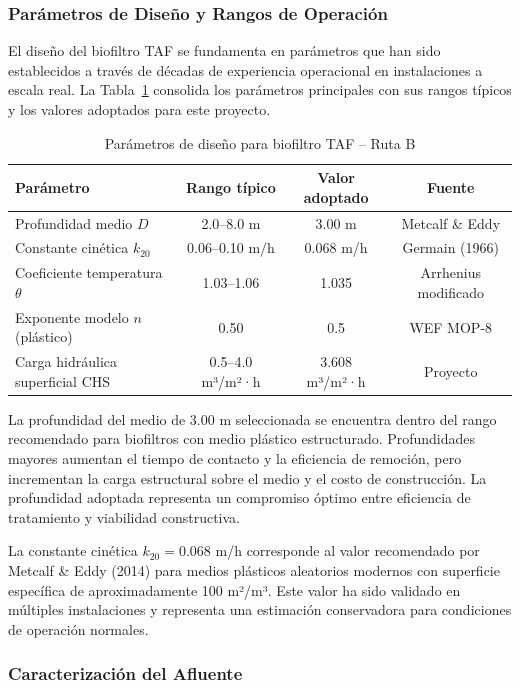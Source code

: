 \documentclass[12pt,a4paper]{article}
\begin{document}
\subsubsection*{Parámetros de Diseño y Rangos de Operación}

El diseño del biofiltro TAF se fundamenta en parámetros que han sido establecidos a través de décadas de experiencia operacional en instalaciones a escala real. La Tabla~\ref{tab:parametros_taf} consolida los parámetros principales con sus rangos típicos y los valores adoptados para este proyecto.

\begin{table}[H]
\centering
\caption{Parámetros de diseño para biofiltro TAF -- Ruta B}
\label{tab:parametros_taf}
\begin{tabular}{p{4cm}ccc}
\toprule
\textbf{Parámetro} & \textbf{Rango típico} & \textbf{Valor adoptado} & \textbf{Fuente} \\
\midrule
Profundidad medio $D$ & 2.0--8.0 m & 3.00 m & Metcalf \& Eddy \\
Constante cinética $k_{20}$ & 0.06--0.10 m/h & 0.068 m/h & Germain (1966) \\
Coeficiente temperatura $\theta$ & 1.03--1.06 & 1.035 & Arrhenius modificado \\
Exponente modelo $n$ (plástico) & 0.50 & 0.5 & WEF MOP-8 \\
Carga hidráulica superficial CHS & 0.5--4.0 m³/m²·h & 3.608 m³/m²·h & Proyecto \\
\bottomrule
\end{tabular}
\end{table}

La profundidad del medio de 3.00 m seleccionada se encuentra dentro del rango recomendado para biofiltros con medio plástico estructurado. Profundidades mayores aumentan el tiempo de contacto y la eficiencia de remoción, pero incrementan la carga estructural sobre el medio y el costo de construcción. La profundidad adoptada representa un compromiso óptimo entre eficiencia de tratamiento y viabilidad constructiva.

La constante cinética $k_{20} = 0.068$ m/h corresponde al valor recomendado por Metcalf \& Eddy (2014) para medios plásticos aleatorios modernos con superficie específica de aproximadamente 100 m²/m³. Este valor ha sido validado en múltiples instalaciones y representa una estimación conservadora para condiciones de operación normales.

\subsubsection*{Caracterización del Afluente}
\end{document}
